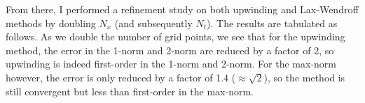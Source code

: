 \documentclass[12pt]{article}
\begin{document}
\begin{enumerate}[(a)]
From there, I performed a refinement study on both upwinding and Lax-Wendroff methods by doubling $N_x$ (and subsequently $N_t$).  The results are tabulated as follows. As we double the number of grid points, we see that for the upwinding method, the error in the 1-norm and 2-norm are reduced by a factor of 2, so upwinding is indeed first-order in the 1-norm and 2-norm.  For the max-norm however, the error is only reduced by a factor of 1.4 ($\approx \sqrt{2}$), so the method is still convergent but less than first-order in the max-norm.

\begin{minipage}{0.5\textwidth}
\begin{table}[H]

\end{table}
\end{minipage}
\end{enumerate}
\end{document}
